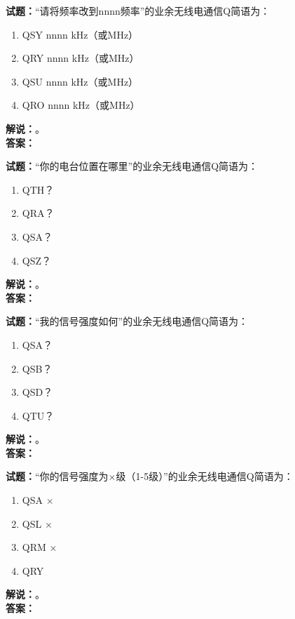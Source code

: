 \documentclass{ctexbook}
\begin{document}
\vspace{\baselineskip}

\noindent\textbf{试题：}“请将频率改到nnnn频率”的业余无线电通信Q简语为：
\begin{enumerate}[leftmargin=3em]
  \item QSY nnnn \si{\kHz}（或\unit{\MHz}）
  \item QRY nnnn \si{\kHz}（或\unit{\MHz}）
  \item QSU nnnn \si{\kHz}（或\unit{\MHz}）
  \item QRO nnnn \si{\kHz}（或\unit{\MHz}）
\end{enumerate}
\noindent\textbf{解说：}\textbf{}。\\\noindent\textbf{答案：}

\vspace{\baselineskip}

\noindent\textbf{试题：}“你的电台位置在哪里”的业余无线电通信Q简语为：
\begin{enumerate}[leftmargin=3em]
  \item QTH？
  \item QRA？
  \item QSA？
  \item QSZ？
\end{enumerate}
\noindent\textbf{解说：}\textbf{}。\\\noindent\textbf{答案：}

\vspace{\baselineskip}

\noindent\textbf{试题：}“我的信号强度如何”的业余无线电通信Q简语为：
\begin{enumerate}[leftmargin=3em]
  \item QSA？
  \item QSB？
  \item QSD？
  \item QTU？
\end{enumerate}
\noindent\textbf{解说：}\textbf{}。\\\noindent\textbf{答案：}

\vspace{\baselineskip}

\noindent\textbf{试题：}“你的信号强度为×级（1-5级）”的业余无线电通信Q简语为：
\begin{enumerate}[leftmargin=3em]
  \item QSA ×
  \item QSL ×
  \item QRM ×
  \item QRY
\end{enumerate}
\noindent\textbf{解说：}\textbf{}。\\\noindent\textbf{答案：}
\end{document}
